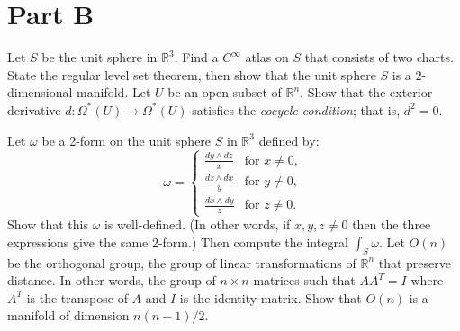 \documentclass{exam}
\begin{document}
\section*{Part B}
\begin{questions}
    \question
        Let $S$ be the unit sphere in $\mathbb{R}^3$. Find a $C^\infty$ atlas on $S$ that consists of two charts.
    \question
        State the regular level set theorem, then show that the unit sphere $S$ is a $2$-dimensional manifold.
    \question
        Let $U$ be an open subset of $\mathbb{R}^n$. Show that the exterior derivative $d : \Omega^\ast(U) \to \Omega^\ast(U)$ satisfies the \textit{cocycle condition}; that is, $d^2=0$.
    \question
    \question
        Let $\omega$ be a 2-form on the unit sphere $S$ in $\mathbb{R}^3$ defined by:
        \[\omega = \begin{cases}
            \frac{dy\wedge dz}{x} & \text{for } x\not = 0,\\
            \frac{dz\wedge dx}{y} & \text{for } y\not = 0,\\
            \frac{dx\wedge dy}{z} & \text{for } z\not = 0.
        \end{cases}\]
        Show that this $\omega$ is well-defined. (In other words, if $x,y,z \not = 0$ then the three expressions give the same 2-form.) Then compute the integral $\int_S\omega$.
    \question
        Let $O(n)$ be the orthogonal group, the group of linear transformations of $\mathbb{R}^n$ that preserve distance. In other words, the group of $n\times n$ matrices such that $AA^T = I$ where $A^T$ is the transpose of $A$ and $I$ is the identity matrix. Show that $O(n)$ is a manifold of dimension $n(n-1)/2$.
    \end{questions}
\end{document}
